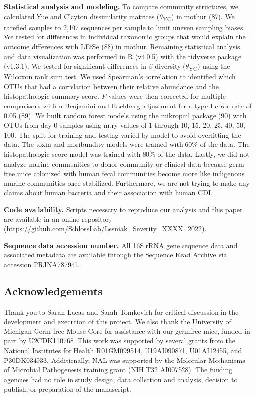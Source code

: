 \documentclass[
  12pt,
]{article}
\begin{document}
\textbf{Statistical analysis and modeling.} To compare community
structures, we calculated Yue and Clayton dissimilarity matrices
(\(\theta\)\textsubscript{YC}) in mothur (87). We rarefied samples to
2,107 sequences per sample to limit uneven sampling biases. We tested
for differences in individual taxonomic groups that would explain the
outcome differences with LEfSe (88) in mothur. Remaining statistical
analysis and data visualization was performed in R (v4.0.5) with the
tidyverse package (v1.3.1). We tested for significant differences in
\(\beta\)-diversity (\(\theta\)\textsubscript{YC}) using the Wilcoxon
rank sum test. We used Spearman's correlation to identified which OTUs
that had a correlation between their relative abundance and the
histopathologic summary score. \emph{P} values were then corrected for
multiple comparisons with a Benjamini and Hochberg adjustment for a type
I error rate of 0.05 (89). We built random forest models using the
mikropml package (90) with OTUs from day 0 samples using mtry values of
1 through 10, 15, 20, 25, 40, 50, 100. The split for training and
testing varied by model to avoid overfitting the data. The toxin and
moribundity models were trained with 60\% of the data. The
histopathologic score model was trained with 80\% of the data. Lastly,
we did not analyze murine communities to donor community or clinical
data because germ-free mice colonized with human fecal communities
become more like indigenous murine communities once stabilized.
Furthermore, we are not trying to make any claims about human bacteria
and their association with human CDI.

\textbf{Code availability.} Scripts necessary to reproduce our analysis
and this paper are available in an online repository
(\url{https://github.com/SchlossLab/Lesniak_Severity_XXXX_2022}).

\textbf{Sequence data accession number.} All 16S rRNA gene sequence data
and associated metadata are available through the Sequence Read Archive
via accession PRJNA787941.

\hypertarget{acknowledgements}{%
\subsection{Acknowledgements}\label{acknowledgements}}

Thank you to Sarah Lucas and Sarah Tomkovich for critical discussion in
the development and execution of this project. We also thank the
University of Michigan Germ-free Mouse Core for assistance with our
germfree mice, funded in part by U2CDK110768. This work was supported by
several grants from the National Institutes for Health R01GM099514,
U19AI090871, U01AI12455, and P30DK034933. Additionally, NAL was
supported by the Molecular Mechanisms of Microbial Pathogenesis training
grant (NIH T32 AI007528). The funding agencies had no role in study
design, data collection and analysis, decision to publish, or
preparation of the manuscript.
\end{document}
